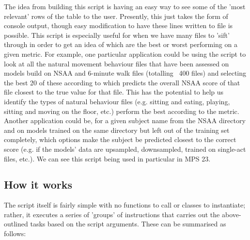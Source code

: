 \documentclass[12pt,twoside]{report}
\begin{document}
\quad The idea from building this script is having an easy way to see some of the 'most relevant' rows of the table to the user. Presently, this just takes the form of console output, though easy modification to have these lines written to file is possible. This script is especially useful for when we have many files to 'sift' through in order to get an idea of which are the best or worst performing on a given metric. For example, one particular application could be using the script to look at all the natural movement behaviour files that have been assessed on models build on NSAA and 6-minute walk files (totalling ~400 files) and selecting the best 20 of these according to which predicts the overall NSAA score of that file closest to the true value for that file. This has the potential to help us identify the types of natural behaviour files (e.g. sitting and eating, playing, sitting and moving on the floor, etc.) perform the best according to the metric. Another application could be, for a given subject name from the NSAA directory and on models trained on the same directory but left out of the training set completely, which options make the subject be predicted closest to the correct score (e.g. if the models’ data are upsampled, downsampled, trained on single-act files, etc.). We can see this script being used in particular in MPS 23.

\subsection{How it works}

\quad The script itself is fairly simple with no functions to call or classes to instantiate; rather, it executes a series of 'groups' of instructions that carries out the above-outlined tasks based on the script arguments. These can be summarised as follows:
\end{document}
